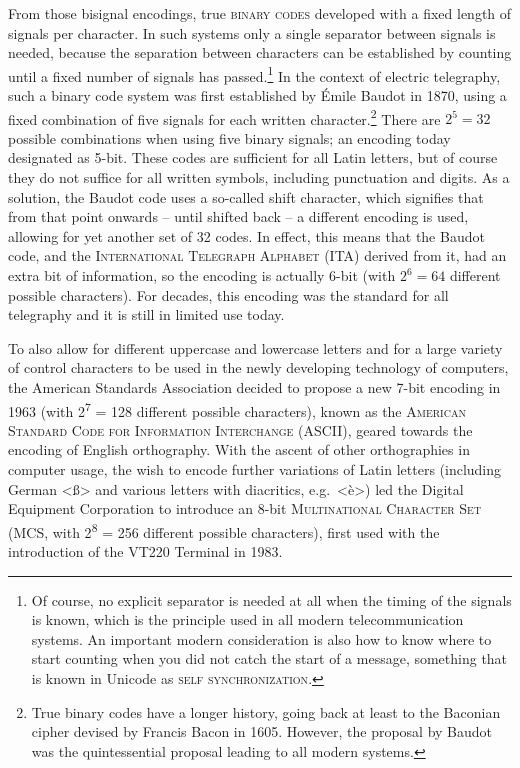 From those bisignal encodings, true \textsc{binary codes} developed with a fixed
length of signals per character. In such systems only a single separator between
signals is needed, because the separation between characters can be established
by counting until a fixed number of signals has passed.\footnote{Of course, no
explicit separator is needed at all when the timing of the signals is known, which is
the principle used in all modern telecommunication systems. An important modern
consideration is also how to know where to start counting when you did not catch
the start of a message, something that is known in Unicode as \textsc{self
synchronization}.} In the context of electric telegraphy, such a binary code
system was first established by Émile Baudot in 1870, using a fixed combination
of five signals for each written character.\footnote{True binary codes have a
longer history, going back at least to the Baconian cipher devised by Francis
Bacon in 1605. However, the proposal by Baudot was the quintessential proposal
leading to all modern systems.} There are $2^5 = 32$ possible combinations when
using five binary signals; an encoding today designated as 5-bit. These
codes are sufficient for all Latin letters, but of course they do not suffice
for all written symbols, including punctuation and digits. As a solution, the
Baudot code uses a so-called shift character, which signifies that from
that point onwards -- until shifted back -- a different encoding is used, allowing
for yet another set of 32 codes. In effect, this means that the Baudot code, and
the \textsc{International Telegraph Alphabet} (ITA) derived from it, had an
extra bit of information, so the encoding is actually 6-bit (with $2^6
= 64$ different possible characters). For decades, this encoding was the
standard for all telegraphy and it is still in limited use today.

To also allow for different uppercase and lowercase letters and for a large
variety of control characters to be used in the newly developing technology of
computers, the American Standards Association decided to propose a new 7-bit
encoding in 1963 (with 2\textsuperscript{7} = 128 different possible characters), 
known as the
\textsc{American Standard Code for Information Interchange} (ASCII), geared
towards the encoding of English orthography. With the ascent of other
orthographies in computer usage, the wish to encode further variations of Latin
letters (including German <ß> and various letters with diacritics, e.g.\ <è>) led the
Digital Equipment Corporation to introduce an 8-bit \textsc{Multinational
Character Set} (MCS, with 2\textsuperscript{8} = 256 different possible characters), first used with the introduction of the VT{\large 220} Terminal in 1983. 

